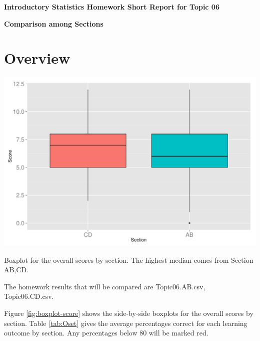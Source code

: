 \documentclass[12pt,nohyper]{tufte-handout}\usepackage[]{graphicx}\usepackage[]{color}
\begin{document}
\centerline{\Large\bf Introductory Statistics Homework Short Report for Topic 06}
\centerline{\bf Comparison among Sections}
\centerline{\bf }

\section{Overview}


\begin{marginfigure}
\includegraphics[width=0.95\linewidth]{Topic06_boxplot_score}
\caption{\label{fig:boxplot-score}Boxplot for the overall scores by section. The highest median comes from Section AB,CD.}
\end{marginfigure}

The homework results that will be compared are Topic06.AB.csv, Topic06.CD.csv.

Figure \ref{fig:boxplot-score} shows the side-by-side boxplots
for the overall scores by section.
Table \ref{tab:Oset} gives the average percentages correct for
each learning outcome by section. Any percentages below 80
will be marked red.
\end{document}
